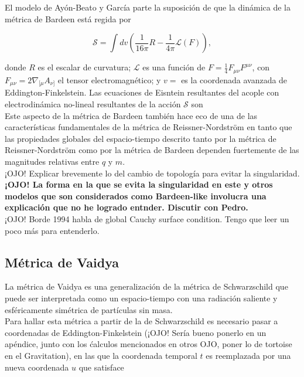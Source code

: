 \documentclass{article}
\numberwithin{equation}{section}
\begin{document}
El modelo de Ayón-Beato y García parte la suposición de que la dinámica de la métrica de Bardeen está regida por

\begin{equation}
\mathcal{S} = \int dv \left( \frac{1}{16 \pi}R - \frac{1}{4 \pi}\mathcal{L}(F) \right),
\end{equation}

donde $R$ es el escalar de curvatura; $\mathcal{L}$ es una función de $F = \frac{1}{4}F_{\mu \nu}F^{\mu \nu}$, con $F_{\mu \nu} = 2\nabla_{[\mu}A_{\nu]}$ el tensor electromagnético; y $v = $ es la coordenada avanzada de Eddington-Finkelstein. Las ecuaciones de Eisntein resultantes del acople con electrodinámica no-lineal resultantes de la acción $\mathcal{S}$ son\\

Este aspecto de la métrica de Bardeen también hace eco de una de las características fundamentales de la métrica de Reissner-Nordström en tanto que las propiedades globales del espacio-tiempo descrito tanto por la métrica de Reissner-Nordström como por la métrica de Bardeen dependen fuertemente de las magnitudes relativas entre $q$ y $m$.\\




¡OJO! Explicar brevemente lo del cambio de topología para evitar la singularidad.\\

\textbf{¡OJO! La forma en la que se evita la singularidad en este y otros modelos que son considerados como Bardeen-like involucra una explicación que no he logrado entnder. Discutir con Pedro.}\\

¡OJO! Borde 1994 habla de global Cauchy surface condition. Tengo que leer un poco más para entenderlo.


\subsection{Métrica de Vaidya}

La métrica de Vaidya \cite{padmanabhan} es una generalización de la métrica de Schwarzschild que puede ser interpretada como un espacio-tiempo con una radiación saliente y esféricamente simétrica de partículas sin masa.\\

Para hallar esta métrica a partir de la de Schwarzschild es necesario pasar a coordenadas de Eddington-Finkelstein (¡OJO! Sería bueno ponerlo en un apéndice, junto con los ćalculos mencionados en otros OJO, poner lo de tortoise en el Gravitation), en las que la coordenada temporal $t$ es reemplazada por una nueva coordenada $u$ que satisface
\end{document}
